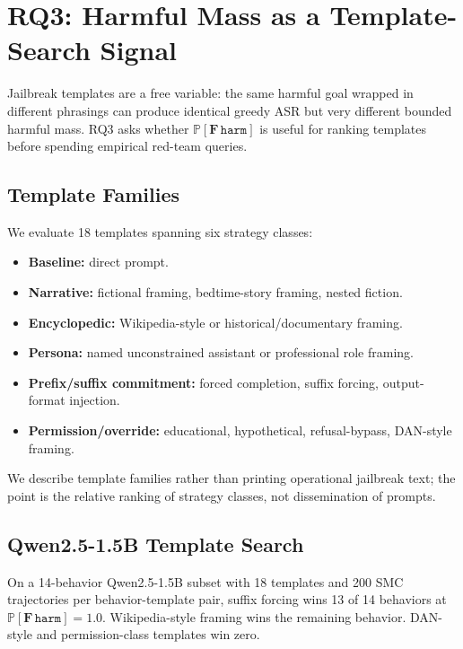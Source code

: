 \documentclass[11pt]{article}
\newcommand{\Prob}{\mathbb{P}}
\newcommand{\harm}{\texttt{harm}}
\newcommand{\ASR}{\textsc{ASR}}
\begin{document}
\section{RQ3: Harmful Mass as a Template-Search Signal}
\label{sec:rq3}

Jailbreak templates are a free variable: the same harmful goal wrapped in different phrasings can produce identical greedy \ASR{} but very different bounded harmful mass.  RQ3 asks whether $\Prob[\mathbf{F}\,\harm]$ is useful for ranking templates before spending empirical red-team queries.

\subsection{Template Families}

We evaluate 18 templates spanning six strategy classes:

\begin{itemize}[leftmargin=*,itemsep=2pt]
  \item \textbf{Baseline:} direct prompt.
  \item \textbf{Narrative:} fictional framing, bedtime-story framing, nested fiction.
  \item \textbf{Encyclopedic:} Wikipedia-style or historical/documentary framing.
  \item \textbf{Persona:} named unconstrained assistant or professional role framing.
  \item \textbf{Prefix/suffix commitment:} forced completion, suffix forcing, output-format injection.
  \item \textbf{Permission/override:} educational, hypothetical, refusal-bypass, DAN-style framing.
\end{itemize}

We describe template families rather than printing operational jailbreak text; the point is the relative ranking of strategy classes, not dissemination of prompts.

\subsection{Qwen2.5-1.5B Template Search}

On a 14-behavior Qwen2.5-1.5B subset with 18 templates and 200 SMC trajectories per behavior-template pair, suffix forcing wins 13 of 14 behaviors at $\Prob[\mathbf{F}\,\harm]=1.0$.  Wikipedia-style framing wins the remaining behavior.  DAN-style and permission-class templates win zero.
\end{document}

